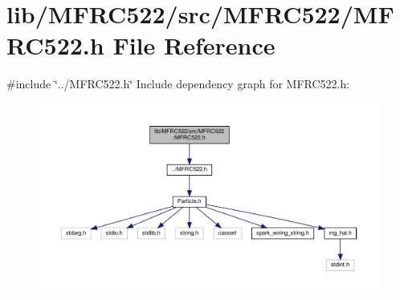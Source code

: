 \section{lib/\+M\+F\+R\+C522/src/\+M\+F\+R\+C522/\+M\+F\+R\+C522.h File Reference}
\label{_m_f_r_c522_2_m_f_r_c522_8h}
{\ttfamily \#include \char`\"{}../\+M\+F\+R\+C522.\+h\char`\"{}}\newline
Include dependency graph for M\+F\+R\+C522.\+h\+:\nopagebreak
\begin{figure}[H]
\begin{center}
\leavevmode
\includegraphics[width=350pt]{_m_f_r_c522_2_m_f_r_c522_8h__incl}
\end{center}
\end{figure}

